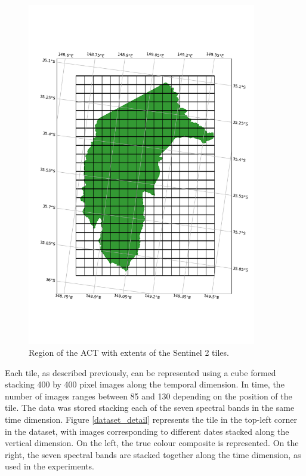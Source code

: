 \documentclass[essd, manuscript]{copernicus}
\begin{document}
\begin{figure}%
    \includegraphics[width=10cm]{fig1.png}
    \caption{Region of the ACT with extents of the Sentinel 2 tiles.}%
    \label{dataset}%
\end{figure}

Each tile, as described previously, can be represented using a cube formed stacking 400 by 400 pixel images along the temporal dimension. In time, the number of images ranges between 85 and 130 depending on the position of the tile. The data was stored stacking each of the seven spectral bands in the same time dimension. Figure \ref{dataset_detail} represents the tile in the top-left corner in the dataset, with images corresponding to different dates stacked along the vertical dimension. On the left, the true colour composite is represented. On the right, the seven spectral bands are stacked together along the time dimension, as used in the experiments. 
\end{document}
